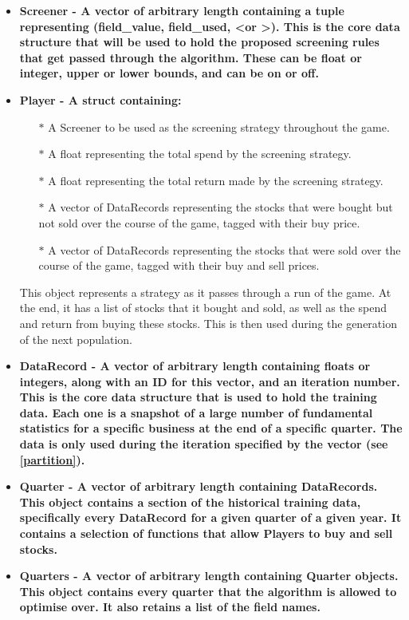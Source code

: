 \begin{itemize}
    \item \bf Screener \rm - A vector of arbitrary length containing a tuple representing (field\_value, field\_used, \textless or \textgreater). This is the core data structure that will be used to hold the proposed screening rules that get passed through the algorithm. These can be float or integer, upper or lower bounds, and can be on or off.
    \item \bf Player \rm - A struct containing:
    \begin{itemize}
        \item[$\ast$] A Screener to be used as the screening strategy throughout the game.
        \item[$\ast$] A float representing the total spend by the screening strategy.
        \item[$\ast$] A float representing the total return made by the screening strategy.
        \item[$\ast$] A vector of DataRecords representing the stocks that were bought but not sold over the course of the game, tagged with their buy price.
        \item[$\ast$] A vector of DataRecords representing the stocks that were sold over the course of the game, tagged with their buy and sell prices.
    \end{itemize}
    This object represents a strategy as it passes through a run of the game. At the end, it has a list of stocks that it bought and sold, as well as the spend and return from buying these stocks. This is then used during the generation of the next population.
    \item \bf DataRecord \rm - A vector of arbitrary length containing floats or integers, along with an ID for this vector, and an iteration number. This is the core data structure that is used to hold the training data. Each one is a snapshot of a large number of fundamental statistics for a specific business at the end of a specific quarter. The data is only used during the iteration specified by the vector (see \ref{partition}).
    \item \bf Quarter \rm - A vector of arbitrary length containing DataRecords. This object contains a section of the historical training data, specifically every DataRecord for a given quarter of a given year. It contains a selection of functions that allow Players to buy and sell stocks.
    \item \bf Quarters \rm - A vector of arbitrary length containing Quarter objects. This object contains every quarter that the algorithm is allowed to optimise over. It also retains a list of the field names.

\end{itemize}
